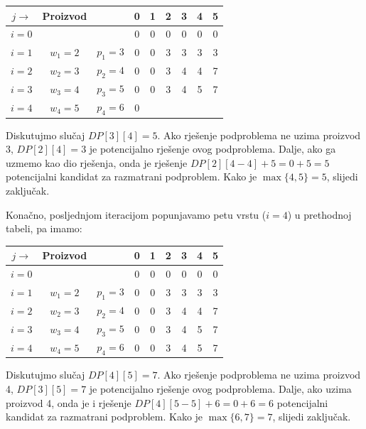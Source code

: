   \begin{table}[H]
	\centering
	\begin{tabular}{|c|cc|cccccc|}\hline
		
		$j\rightarrow$	& Proizvod   &              &	 	0	&1&	2	&3	&4	&5 \\ \hline
		
		$i=0$ & 	& 	    & 	    0	&0	&0	&0	&0	&0  \\
		$i=1$ &	$w_1=2$	&$p_1=3$ &	0	&0 	&3 	&3 	&3 	&3\\ 
		$i=2$ &	$w_2=3$	&$p_2=4$ &	0   &0	&3 	&4 	&4	&7\\	 
		$i=3$ &	$w_3=4$	&$p_3=5$ &	0	&0 	&3 	&4 	&5 	&7 \\ 
		$i=4$ &	$w_4=5$ &$p_4=6$ &	0	& 	& 	& 	& 	&\\ \hline
	\end{tabular}
\end{table}
 Diskutujmo slučaj $DP[3][4]=5$.   Ako rješenje podproblema ne uzima proizvod 3, $DP[2][4]=3 $ je potencijalno rješenje ovog podproblema. Dalje, ako ga uzmemo kao dio rješenja, onda je rješenje $DP[2][4-4] + 5 = 0 + 5 = 5$ potencijalni kandidat za razmatrani podproblem. Kako je $\max\{4, 5\}=5$, slijedi zaključak.
 
   Konačno, posljednjom iteracijom popunjavamo petu vrstu ($i=4$) u prethodnoj tabeli, pa imamo: 
 
 \begin{table}[H]
 	\centering
 	\begin{tabular}{|c|cc|cccccc|}\hline
 		
 		$j\rightarrow$	& Proizvod   &              &	 	0	&1&	2	&3	&4	&5 \\ \hline
 		
 		$i=0$ & 	& 	    & 	    0	&0	&0	&0	&0	&0  \\
 		$i=1$ &	$w_1=2$	&$p_1=3$ &	0	&0 	&3 	&3 	&3 	&3\\ 
 		$i=2$ &	$w_2=3$	&$p_2=4$ &	0   &0	&3 	&4 	&4	&7\\	 
 		$i=3$ &	$w_3=4$	&$p_3=5$ &	0	&0 	&3 	&4 	&5 	&7 \\ 
 		$i=4$ &	$w_4=5$ &$p_4=6$ &	0	&0 	&3 	&4 	&5 	&7\\ \hline
 	\end{tabular}
 \end{table}

 Diskutujmo slučaj $DP[4][5]=7$.  Ako rješenje podproblema ne uzima proizvod 4, $DP[3][5]=7$ je potencijalno rješenje ovog podproblema. Dalje, ako uzima proizvod 4, onda  je i rješenje $DP[4][5-5] + 6 = 0 + 6 = 6$ potencijalni kandidat za razmatrani podproblem. Kako je $\max\{6, 7\}=7$, slijedi zaključak.
 
